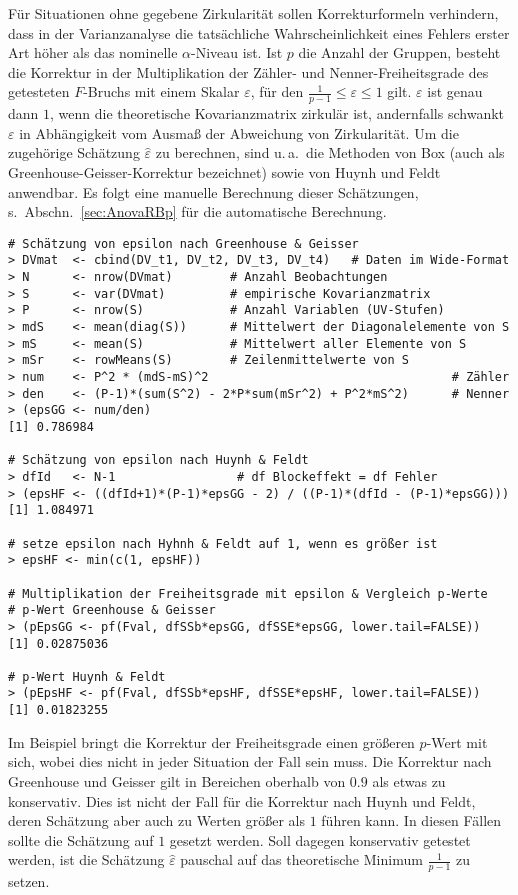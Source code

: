 Für Situationen ohne gegebene Zirkularität sollen Korrekturformeln verhindern, dass in der Varianzanalyse die tatsächliche Wahrscheinlichkeit eines Fehlers erster Art höher als das nominelle $\alpha$-Niveau ist. Ist $p$ die Anzahl der Gruppen, besteht die Korrektur in der Multiplikation der Zähler- und Nenner-Freiheitsgrade des getesteten $F$-Bruchs mit einem Skalar $\varepsilon$, für den $\frac{1}{p-1} \leq \varepsilon \leq 1$ gilt. $\varepsilon$ ist genau dann $1$, wenn die theoretische Kovarianzmatrix zirkulär ist, andernfalls schwankt $\varepsilon$ in Abhängigkeit vom Ausmaß der Abweichung von Zirkularität. Um die zugehörige Schätzung $\hat{\varepsilon}$ zu berechnen, sind u.\,a.\ die Methoden von Box (auch als Greenhouse-Geisser-Korrektur bezeichnet) sowie von Huynh und Feldt anwendbar. Es folgt eine manuelle Berechnung dieser Schätzungen, s.\ Abschn.\ \ref{sec:AnovaRBp} für die automatische Berechnung.
\begin{lstlisting}
# Schätzung von epsilon nach Greenhouse & Geisser
> DVmat  <- cbind(DV_t1, DV_t2, DV_t3, DV_t4)   # Daten im Wide-Format
> N      <- nrow(DVmat)        # Anzahl Beobachtungen
> S      <- var(DVmat)         # empirische Kovarianzmatrix
> P      <- nrow(S)            # Anzahl Variablen (UV-Stufen)
> mdS    <- mean(diag(S))      # Mittelwert der Diagonalelemente von S
> mS     <- mean(S)            # Mittelwert aller Elemente von S
> mSr    <- rowMeans(S)        # Zeilenmittelwerte von S
> num    <- P^2 * (mdS-mS)^2                                  # Zähler
> den    <- (P-1)*(sum(S^2) - 2*P*sum(mSr^2) + P^2*mS^2)      # Nenner
> (epsGG <- num/den)
[1] 0.786984

# Schätzung von epsilon nach Huynh & Feldt
> dfId   <- N-1                 # df Blockeffekt = df Fehler
> (epsHF <- ((dfId+1)*(P-1)*epsGG - 2) / ((P-1)*(dfId - (P-1)*epsGG)))
[1] 1.084971

# setze epsilon nach Hyhnh & Feldt auf 1, wenn es größer ist
> epsHF <- min(c(1, epsHF))

# Multiplikation der Freiheitsgrade mit epsilon & Vergleich p-Werte
# p-Wert Greenhouse & Geisser
> (pEpsGG <- pf(Fval, dfSSb*epsGG, dfSSE*epsGG, lower.tail=FALSE))
[1] 0.02875036

# p-Wert Huynh & Feldt
> (pEpsHF <- pf(Fval, dfSSb*epsHF, dfSSE*epsHF, lower.tail=FALSE))
[1] 0.01823255
\end{lstlisting}

Im Beispiel bringt die Korrektur der Freiheitsgrade einen größeren $p$-Wert mit sich, wobei dies nicht in jeder Situation der Fall sein muss. Die Korrektur nach Greenhouse und Geisser gilt in Bereichen oberhalb von $0.9$ als etwas zu konservativ. Dies ist nicht der Fall für die Korrektur nach Huynh und Feldt, deren Schätzung aber auch zu Werten größer als $1$ führen kann. In diesen Fällen sollte die Schätzung auf $1$ gesetzt werden. Soll dagegen konservativ getestet werden, ist die Schätzung $\hat{\varepsilon}$ pauschal auf das theoretische Minimum $\frac{1}{p-1}$ zu setzen.

